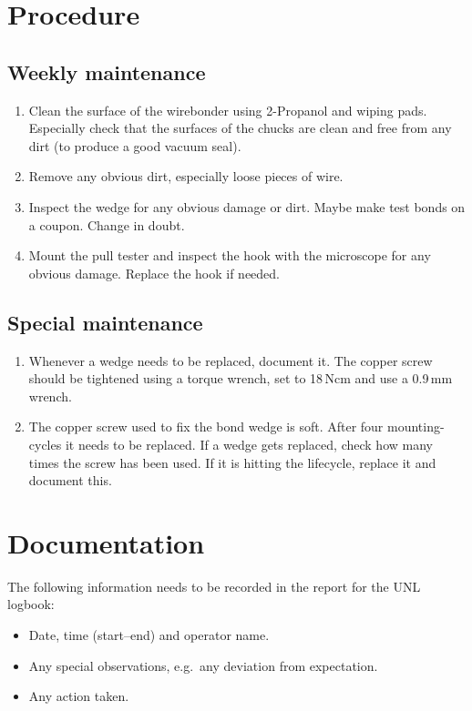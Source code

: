 \documentclass[12pt]{unlsilabsop}
\begin{document}
\section{Procedure}

\subsection{Weekly maintenance}
\begin{enumerate}
    \item Clean the surface of the wirebonder using 2-Propanol and wiping pads. Especially check that the surfaces of the chucks are clean and free from any dirt (to produce a good vacuum seal).
    \item Remove any obvious dirt, especially loose pieces of wire.
    \item Inspect the wedge for any obvious damage or dirt. Maybe make test bonds on a coupon. Change in doubt. 
    \item Mount the pull tester and inspect the hook with the microscope for any obvious damage. Replace the hook if needed.
\end{enumerate}

\subsection{Special maintenance}
\begin{enumerate}
    \item Whenever a wedge needs to be replaced, document it. The copper screw should be tightened using a torque wrench, set to 18\,Ncm and use a 0.9\,mm wrench.
    \item The copper screw used to fix the bond wedge is soft. After four mounting-cycles it needs to be replaced. If a wedge gets replaced, check how many times the screw has been used. If it is hitting the lifecycle, replace it and document this.
\end{enumerate}

\section{Documentation}
The following information needs to be recorded in the report for the UNL logbook:
\begin{itemize}
    \item Date, time (start--end) and operator name.
    \item Any special observations, e.g.~any deviation from expectation.
    \item Any action taken.
\end{itemize}
\end{document}
